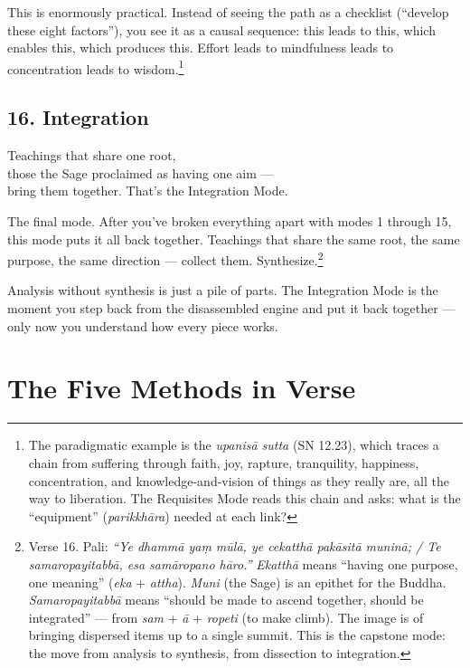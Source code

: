 This is enormously practical. Instead of seeing the path as a checklist (``develop these eight factors''), you see it as a causal sequence: this leads to this, which enables this, which produces this. Effort leads to mindfulness leads to concentration leads to wisdom.\footnote{The paradigmatic example is the \textit{upanisā sutta} (SN 12.23), which traces a chain from suffering through faith, joy, rapture, tranquility, happiness, concentration, and knowledge-and-vision of things as they really are, all the way to liberation. The Requisites Mode reads this chain and asks: what is the ``equipment'' (\textit{parikkhāra}) needed at each link?}

\subsection*{16. Integration}

\begin{versebox}
Teachings that share one root,\\
those the Sage proclaimed as having one aim ---\\
bring them together. That's the Integration Mode.
\end{versebox}

The final mode. After you've broken everything apart with modes 1 through 15, this mode puts it all back together. Teachings that share the same root, the same purpose, the same direction --- collect them. Synthesize.\footnote{Verse 16. Pali: \textit{``Ye dhammā yaṃ mūlā, ye cekatthā pakāsitā muninā; / Te samaropayitabbā, esa samāropano hāro.''} \textit{Ekatthā} means ``having one purpose, one meaning'' (\textit{eka} + \textit{attha}). \textit{Muni} (the Sage) is an epithet for the Buddha. \textit{Samaropayitabbā} means ``should be made to ascend together, should be integrated'' --- from \textit{sam} + \textit{ā} + \textit{ropeti} (to make climb). The image is of bringing dispersed items up to a single summit. This is the capstone mode: the move from analysis to synthesis, from dissection to integration.}

Analysis without synthesis is just a pile of parts. The Integration Mode is the moment you step back from the disassembled engine and put it back together --- only now you understand how every piece works.

\ornament

\section*{The Five Methods in Verse}

